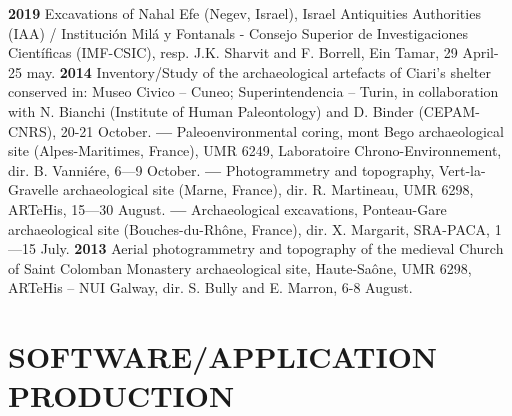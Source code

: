 \documentclass[11pt]{report} %
\begin{document}
\textbf{2019 }Excavations of Nahal Efe (Negev, Israel), Israel Antiquities Authorities (IAA) / Instituci\'{o}n Mil\'{a} y Fontanals - Consejo Superior de Investigaciones Cient\'{i}ficas (IMF-CSIC), resp. J.K. Sharvit and F. Borrell, Ein Tamar, 29 April-25 may.
\smallbreak
\textbf{2014 }Inventory/Study of the archaeological artefacts of Ciari's shelter conserved in: Museo Civico -- Cuneo; Superintendencia -- Turin, in collaboration with N. Bianchi (Institute of Human Paleontology) and D. Binder (CEPAM-CNRS), 20-21 October.
\smallbreak
\textbf{---  }Paleoenvironmental coring, mont Bego archaeological site (Alpes-Maritimes, France), UMR 6249, Laboratoire Chrono-Environnement, dir. B. Vanni\'{e}re, 6---9 October.
\smallbreak
\textbf{---  }Photogrammetry and topography, Vert-la-Gravelle archaeological site (Marne, France), dir. R. Martineau, UMR 6298, ARTeHis, 15---30 August.
\smallbreak
\textbf{---  }Archaeological excavations, Ponteau-Gare archaeological site (Bouches-du-Rh\^{o}ne, France), dir. X. Margarit, SRA-PACA, 1---15 July.\smallbreak
\textbf{2013 }Aerial\textbf{ }photogrammetry and topography of the medieval Church of Saint Colomban Monastery archaeological site, Haute-Sa\^{o}ne, UMR 6298, ARTeHis -- NUI Galway, dir. S. Bully and E. Marron, 6-8 August.

\section*{SOFTWARE/APPLICATION PRODUCTION}
\end{document}
